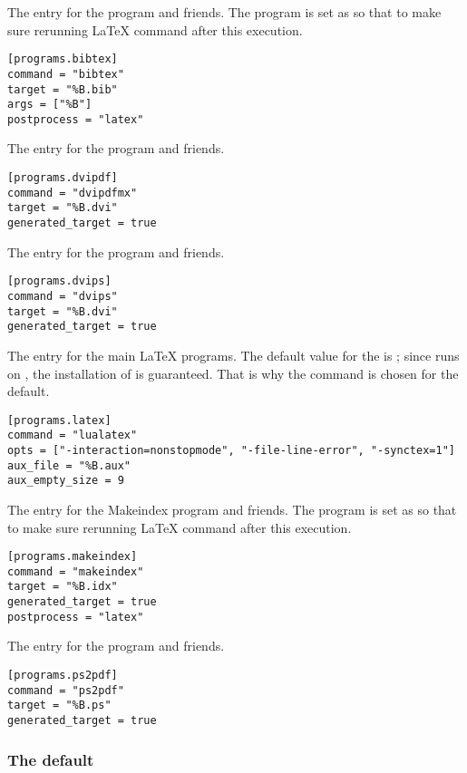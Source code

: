 \documentclass[draft]{llmk-doc}
\begin{document}
 The entry for the {\BibTeX} program and friends. The
 program is set as  so that to make sure
rerunning {\LaTeX} command after this execution.
%
\begin{lstlisting}[style=toml]
[programs.bibtex]
command = "bibtex"
target = "%B.bib"
args = ["%B"]
postprocess = "latex"
\end{lstlisting}

 The entry for the  program and friends.
%
\begin{lstlisting}[style=toml]
[programs.dvipdf]
command = "dvipdfmx"
target = "%B.dvi"
generated_target = true
\end{lstlisting}

 The entry for the  program and friends.
%
\begin{lstlisting}[style=toml]
[programs.dvips]
command = "dvips"
target = "%B.dvi"
generated_target = true
\end{lstlisting}

 The entry for the main {\LaTeX} programs. The default value for
the  is ; since  runs on
, the installation of {\LuaTeX} is guaranteed. That is why the
command is chosen for the default.
%
\begin{lstlisting}[style=toml]
[programs.latex]
command = "lualatex"
opts = ["-interaction=nonstopmode", "-file-line-error", "-synctex=1"]
aux_file = "%B.aux"
aux_empty_size = 9
\end{lstlisting}

 The entry for the Makeindex program and friends. The
 program is set as  so that to make sure
rerunning {\LaTeX} command after this execution.
%
\begin{lstlisting}[style=toml]
[programs.makeindex]
command = "makeindex"
target = "%B.idx"
generated_target = true
postprocess = "latex"
\end{lstlisting}

 The entry for the  program and friends.
%
\begin{lstlisting}[style=toml]
[programs.ps2pdf]
command = "ps2pdf"
target = "%B.ps"
generated_target = true
\end{lstlisting}

\subsubsection{The default }
\label{sec:default-sequence}
\end{document}
